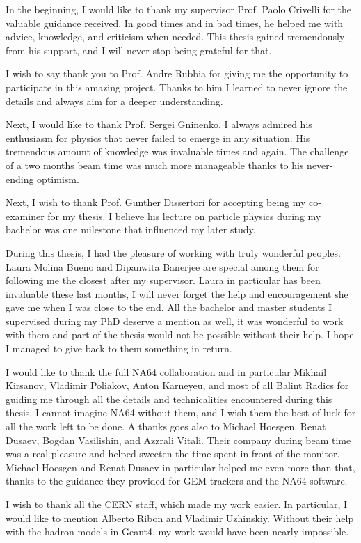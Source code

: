 In the beginning, I would like to thank my supervisor Prof. Paolo Crivelli for the valuable guidance received. In good times and in bad times, he helped me with advice, knowledge, and criticism when needed. This thesis gained tremendously from his support, and I will never stop being grateful for that. 

I wish to say thank you to Prof. Andre Rubbia for giving me the opportunity to participate in this amazing project. Thanks to him I learned to never ignore the details and always aim for a deeper understanding.

Next, I would like to thank Prof. Sergei Gninenko. I always admired his enthusiasm for physics that never failed to emerge in any situation. His tremendous amount of knowledge was invaluable times and again. The challenge of a two months beam time was much more manageable thanks to his never-ending optimism.

Next, I wish to thank Prof. Gunther Dissertori for accepting being my co-examiner for my thesis. I believe his lecture on particle physics during my bachelor was one milestone that influenced my later study.

During this thesis, I had the pleasure of working with truly wonderful peoples. Laura Molina Bueno and Dipanwita Banerjee are special among them for following me the closest after my supervisor. Laura in particular has been invaluable these last months, I will never forget the help and encouragement she gave me when I was close to the end. All the bachelor and master students I supervised during my PhD deserve a mention as well, it was wonderful to work with them and part of the thesis would not be possible without their help. I hope I managed to give back to them something in return.

I would like to thank the full NA64 collaboration and in particular Mikhail Kirsanov, Vladimir Poliakov, Anton Karneyeu, and most of all Balint Radics for guiding me through all the details and technicalities encountered during this thesis. I cannot imagine NA64 without them, and I wish them the best of luck for all the work left to be done. A thanks goes also to Michael Hoesgen, Renat Dusaev, Bogdan Vasilishin, and Azzrali Vitali. Their company during beam time was a real pleasure and helped sweeten the time spent in front of the monitor. Michael Hoesgen and Renat Dusaev in particular helped me even more than that, thanks to the guidance they provided for GEM trackers and the NA64 software.

I wish to thank all the CERN staff, which made my work easier. In particular, I would like to mention Alberto Ribon and Vladimir Uzhinskiy. Without their help with the hadron models in Geant4, my work would have been nearly impossible.

